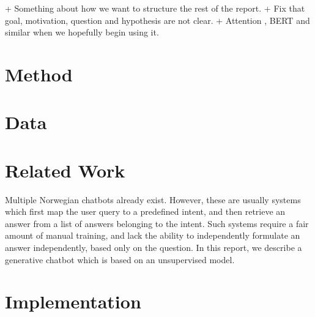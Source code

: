 \documentclass{article}
\begin{document}
+ Something about how we want to structure the rest of the report.
+ Fix that goal, motivation, question and hypothesis are not clear.
+ Attention \cite{Bahdanau2015}, BERT and similar when we hopefully begin using it.

\section{Method}


\section{Data}


\section{Related Work}

Multiple Norwegian chatbots already exist. However, these are usually systems which first map
the user query to a predefined intent, and then retrieve an answer from a list of answers
belonging to the intent. Such systems require a fair amount of manual training, and lack
the ability to independently formulate an answer independently, based only on the question.
In this report, we describe a generative chatbot which is based on an unsupervised model.

\section{Implementation}
\end{document}
